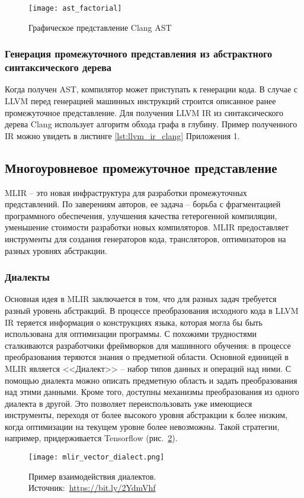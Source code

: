 \begin{figure}[h]
  \centering
  \texttt{[image: ast\_factorial]}
  \caption{Графическое представление Clang AST} 
  \label{fig:clang_ast}
\end{figure}


\subsubsection{Генерация промежуточного представления из абстрактного синтаксического дерева}
Когда получен AST, компилятор может приступать к генерации кода. В случае с LLVM
перед генерацией машинных инструкций строится описанное ранее промежуточное
представление. Для получения LLVM IR из синтаксического дерева Clang использует
алгоритм обхода графа в глубину. Пример полученного IR можно увидеть в листинге
\ref{lst:llvm_ir_clang} Приложения 1.

\subsection{Многоуровневое промежуточное представление}
MLIR -- это новая инфраструктура для разработки промежуточных представлений.
По заверениям авторов, ее задача -- борьба с фрагментацией программного
обеспечения, улучшения качества гетерогенной компиляции, уменьшение стоимости
разработки новых компиляторов. MLIR предоставляет инструменты для создания
генераторов кода, трансляторов, оптимизаторов на разных уровнях абстракции\cite{Lattner2020}.
\subsubsection{Диалекты}
Основная идея в MLIR заключается в том, что для разных задач требуется разный
уровень абстракций. В процессе преобразования исходного кода в LLVM IR теряется
информация о конструкциях языка, которая могла бы быть использована для
оптимизации программы. С похожими трудностями сталкиваются разработчики
фреймворков для машинного обучения: в процессе преобразования теряются знания
о предметной области. Основной единицей в MLIR является <<Диалект>> -- набор
типов данных и операций над ними. С помощью диалекта можно описать предметную
область и задать преобразования над этими данными. Кроме того, доступны
механизмы преобразования из одного диалекта в другой. Это позволяет
переиспользовать уже имеющиеся инструменты, переходя от более высокого уровня
абстракции к более низким, когда оптимизации на текущем уровне более невозможны.
Такой стратегии, например, придерживается Tensorflow (рис.~\ref{fig:tf_dialects}).
\begin{figure}[h]
    \centering
    \texttt{[image: mlir\_vector\_dialect.png]}
    \caption{Пример взаимодействия диалектов. Источник:~\url{https://bit.ly/2YdmVhf}
    }
    \label{fig:tf_dialects}
\end{figure}
